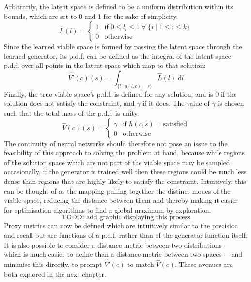 \documentclass[../../main.tex]{subfiles}
\begin{document}
Arbitrarily, the latent space is defined to be a uniform distribution within its bounds, which are set to 0 and 1 for the sake of simplicity.
\begin{equation}
	\hat{L}(l)=\left\{\begin{array}{ll}1&\mbox{if }0\le l_i\le1\;\forall\;\{i\;|\;1\le i\le k\}\\0&\mbox{otherwise}\end{array}\right.
\end{equation}
Since the learned viable space is formed by passing the latent space through the learned generator, its p.d.f. can be defined as the integral of the latent space p.d.f. over all points in the latent space which map to that solution:
\begin{equation}
	\hat{V'}(c)(s)=\int_{\{l\;|\;g(l,c)=s\}}\hat{L}(l)\;\mathrm{d}l
\end{equation}
Finally, the true viable space's p.d.f. is defined for any solution, and is $0$ if the solution does not satisfy the constraint, and $\gamma$ if it does.
The value of $\gamma$ is chosen such that the total mass of the p.d.f. is unity.
\begin{equation}
	\hat{V}(c)(s)=\left\{\begin{array}{ll}\gamma&\mbox{if }h(c,s)=\text{satisfied}\\0&\mbox{otherwise}\end{array}\right.
\end{equation}
The continuity of neural networks should therefore not pose an issue to the feasibility of this approach to solving the problem at hand, because while regions of the solution space which are not part of the viable space may be sampled occasionally, if the generator is trained well then these regions could be much less dense than regions that are highly likely to satisfy the constraint.
Intuitively, this can be thought of as the mapping pulling together the distinct modes of the viable space, reducing the distance between them and thereby making it easier for optimisation algorithms to find a global maximum by exploration.
\begin{equation}
	\text{TODO: add graphic displaying this process}
\end{equation}
Proxy metrics can now be defined which are intuitively similar to the precision and recall but are functions of a p.d.f. rather than of the generator function itself.
It is also possible to consider a distance metric between two distributions $-$ which is much easier to define than a distance metric between two spaces $-$ and minimise this directly, to prompt $\hat{V'}(c)$ to match $\hat{V}(c)$.
These avenues are both explored in the next chapter.
\end{document}
